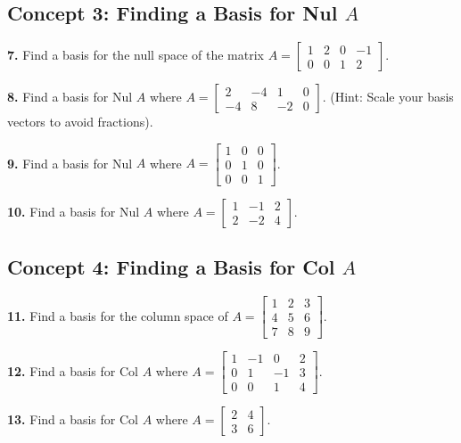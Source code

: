\documentclass[11pt]{article}
\begin{document}
\subsection*{Concept 3: Finding a Basis for Nul $A$}
\textbf{7.} Find a basis for the null space of the matrix $A = \begin{bmatrix} 1 & 2 & 0 & -1 \\ 0 & 0 & 1 & 2 \end{bmatrix}$.

\vspace{0.5cm}
\textbf{8.} Find a basis for Nul $A$ where $A = \begin{bmatrix} 2 & -4 & 1 & 0 \\ -4 & 8 & -2 & 0 \end{bmatrix}$. (Hint: Scale your basis vectors to avoid fractions).

\vspace{0.5cm}
\textbf{9.} Find a basis for Nul $A$ where $A = \begin{bmatrix} 1 & 0 & 0 \\ 0 & 1 & 0 \\ 0 & 0 & 1 \end{bmatrix}$.

\vspace{0.5cm}
\textbf{10.} Find a basis for Nul $A$ where $A = \begin{bmatrix} 1 & -1 & 2 \\ 2 & -2 & 4 \end{bmatrix}$.

\subsection*{Concept 4: Finding a Basis for Col $A$}
\textbf{11.} Find a basis for the column space of $A = \begin{bmatrix} 1 & 2 & 3 \\ 4 & 5 & 6 \\ 7 & 8 & 9 \end{bmatrix}$.

\vspace{0.5cm}
\textbf{12.} Find a basis for Col $A$ where $A = \begin{bmatrix} 1 & -1 & 0 & 2 \\ 0 & 1 & -1 & 3 \\ 0 & 0 & 1 & 4 \end{bmatrix}$.

\vspace{0.5cm}
\textbf{13.} Find a basis for Col $A$ where $A = \begin{bmatrix} 2 & 4 \\ 3 & 6 \end{bmatrix}$.
\end{document}
